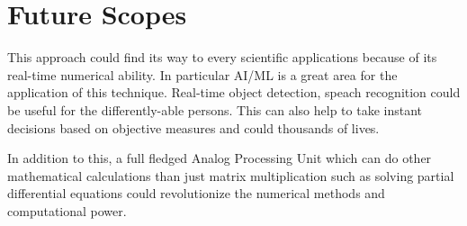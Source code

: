 \chapter{Future Scopes}

This approach could find its way to every scientific applications because of its real-time numerical ability. In particular AI/ML is a great area for the application of this technique. Real-time object detection, speach recognition could be useful for the differently-able persons. This can also help to take instant decisions based on objective measures and could thousands of lives.

In addition to this, a full fledged Analog Processing Unit which can do other mathematical calculations than just matrix multiplication such as solving partial differential equations could revolutionize the numerical methods and computational power.